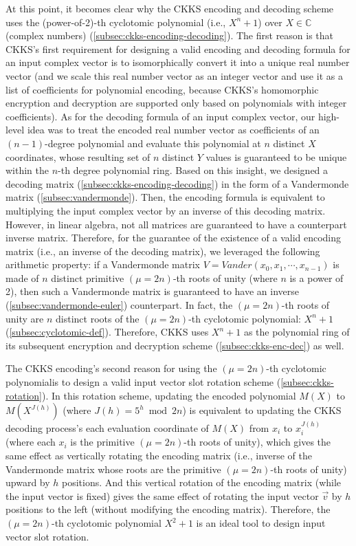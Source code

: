  At this point, it becomes clear why the CKKS encoding and decoding scheme uses the (power-of-2)-th cyclotomic polynomial (i.e., $X^n + 1$) over $X \in \mathbb{C}$ (complex numbers) (\autoref{subsec:ckks-encoding-decoding}). The first reason is that CKKS's first requirement for designing a valid encoding and decoding formula for an input complex vector is to isomorphically convert it into a unique real number vector (and we scale this real number vector as an integer vector and use it as a list of coefficients for polynomial encoding, because CKKS's homomorphic encryption and decryption are supported only based on polynomials with integer coefficients). As for the decoding formula of an input complex vector, our high-level idea was to treat the encoded real number vector as coefficients of an $(n-1)$-degree polynomial and evaluate this polynomial at $n$ distinct $X$ coordinates, whose resulting set of $n$ distinct $Y$ values is guaranteed to be unique within the $n$-th degree polynomial ring. Based on this insight, we designed a decoding matrix (\autoref{subsec:ckks-encoding-decoding}) in the form of a Vandermonde matrix (\autoref{subsec:vandermonde}). Then, the encoding formula is equivalent to multiplying the input complex vector by an inverse of this decoding matrix. However, in linear algebra, not all matrices are guaranteed to have a counterpart inverse matrix. Therefore, for the guarantee of the existence of a valid encoding matrix (i.e., an inverse of the decoding matrix), we leveraged the following arithmetic property: if a Vandermonde matrix $V = \mathit{Vander}(x_0, x_1, \cdots, x_{n-1})$ is made of $n$ distinct primitive $(\mu=2n)$-th roots of unity (where $n$ is a power of 2), then such a Vandermonde matrix is guaranteed to have an inverse (\autoref{subsec:vandermonde-euler}) counterpart. In fact, the $(\mu=2n)$-th roots of unity are $n$ distinct roots of the $(\mu=2n)$-th cyclotomic polynomial: $X^n + 1$ (\autoref{subsec:cyclotomic-def}). Therefore, CKKS uses $X^n + 1$ as the polynomial ring of its subsequent encryption and decryption scheme (\autoref{subsec:ckks-enc-dec}) as well. 

The CKKS encoding's second reason for using the $(\mu=2n)$-th cyclotomic polynomialis to design a valid input vector slot rotation scheme (\autoref{subsec:ckks-rotation}). In this rotation scheme, updating the encoded polynomial $M(X)$ to $M(X^{J(h)})$ (where $J(h) = 5^h \bmod 2n$) is equivalent to updating the CKKS decoding process's each evaluation coordinate of $M(X)$ from $x_i$ to $x_i^{J(h)}$ (where each $x_i$ is the primitive $(\mu=2n)$-th roots of unity), which gives the same effect as vertically rotating the encoding matrix (i.e., inverse of the Vandermonde matrix whose roots are the primitive $(\mu=2n)$-th roots of unity) upward by $h$ positions. And this vertical rotation of the encoding matrix (while the input vector is fixed) gives the same effect of rotating the input vector $\vec{v}$ by $h$ positions to the left (without modifying the encoding matrix). Therefore, the $(\mu=2n)$-th cyclotomic polynomial $X^2 + 1$ is an ideal tool to design input vector slot rotation. 


